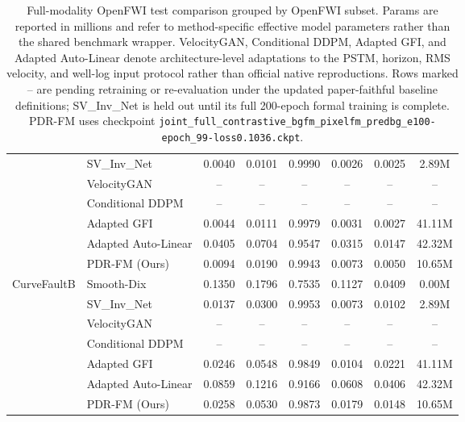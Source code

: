 \documentclass[letterpaper]{article}
\begin{document}
\begin{table}[t]
{\begin{tabular}{llcccccc}
 & SV\_Inv\_Net & 0.0040 & 0.0101 & 0.9990 & 0.0026 & 0.0025 & 2.89M \\
 & VelocityGAN & -- & -- & -- & -- & -- & -- \\
 & Conditional DDPM & -- & -- & -- & -- & -- & -- \\
 & Adapted GFI & 0.0044 & 0.0111 & 0.9979 & 0.0031 & 0.0027 & 41.11M \\
 & Adapted Auto-Linear & 0.0405 & 0.0704 & 0.9547 & 0.0315 & 0.0147 & 42.32M \\
 & PDR-FM (Ours) & 0.0094 & 0.0190 & 0.9943 & 0.0073 & 0.0050 & 10.65M \\
\hline
CurveFaultB & Smooth-Dix & 0.1350 & 0.1796 & 0.7535 & 0.1127 & 0.0409 & 0.00M \\
 & SV\_Inv\_Net & 0.0137 & 0.0300 & 0.9953 & 0.0073 & 0.0102 & 2.89M \\
 & VelocityGAN & -- & -- & -- & -- & -- & -- \\
 & Conditional DDPM & -- & -- & -- & -- & -- & -- \\
 & Adapted GFI & 0.0246 & 0.0548 & 0.9849 & 0.0104 & 0.0221 & 41.11M \\
 & Adapted Auto-Linear & 0.0859 & 0.1216 & 0.9166 & 0.0608 & 0.0406 & 42.32M \\
 & PDR-FM (Ours) & 0.0258 & 0.0530 & 0.9873 & 0.0179 & 0.0148 & 10.65M \\
\hline
\end{tabular}
}
\caption{Full-modality OpenFWI test comparison grouped by OpenFWI subset. Params are reported in millions and refer to method-specific effective model parameters rather than the shared benchmark wrapper. VelocityGAN, Conditional DDPM, Adapted GFI, and Adapted Auto-Linear denote architecture-level adaptations to the PSTM, horizon, RMS velocity, and well-log input protocol rather than official native reproductions. Rows marked -- are pending retraining or re-evaluation under the updated paper-faithful baseline definitions; SV\_Inv\_Net is held out until its full 200-epoch formal training is complete. PDR-FM uses checkpoint \texttt{joint\_full\_contrastive\_bgfm\_pixelfm\_predbg\_e100-epoch\_99-loss0.1036.ckpt}.}
\label{tab:openfwi_full_comparison}
\end{table}
\end{document}
